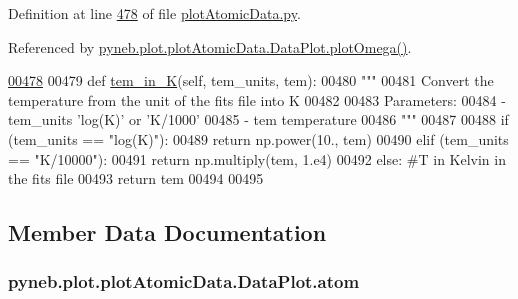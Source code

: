 Definition at line \hyperlink{plot_atomic_data_8py_source_l00478}{478} of file \hyperlink{plot_atomic_data_8py_source}{plot\-Atomic\-Data.\-py}.



Referenced by \hyperlink{plot_atomic_data_8py_source_l00373}{pyneb.\-plot.\-plot\-Atomic\-Data.\-Data\-Plot.\-plot\-Omega()}.


\begin{DoxyCode}
\hypertarget{classpyneb_1_1plot_1_1plot_atomic_data_1_1_data_plot_l00478}{}\hyperlink{classpyneb_1_1plot_1_1plot_atomic_data_1_1_data_plot_a44a19b283355d6c3ad1903e70009cfee}{00478} 
00479     \textcolor{keyword}{def }\hyperlink{classpyneb_1_1plot_1_1plot_atomic_data_1_1_data_plot_a44a19b283355d6c3ad1903e70009cfee}{tem\_in\_K}(self, tem\_units, tem):
00480         \textcolor{stringliteral}{"""}
00481 \textcolor{stringliteral}{        Convert the temperature from the unit of the fits file into K}
00482 \textcolor{stringliteral}{}
00483 \textcolor{stringliteral}{        Parameters:}
00484 \textcolor{stringliteral}{            - tem\_units     'log(K)' or 'K/1000'}
00485 \textcolor{stringliteral}{            - tem           temperature}
00486 \textcolor{stringliteral}{        """}
00487         
00488         \textcolor{keywordflow}{if} (tem\_units == \textcolor{stringliteral}{"log(K)"}):
00489             \textcolor{keywordflow}{return} np.power(10., tem)
00490         \textcolor{keywordflow}{elif} (tem\_units == \textcolor{stringliteral}{"K/10000"}):
00491             \textcolor{keywordflow}{return} np.multiply(tem, 1.e4)
00492         \textcolor{keywordflow}{else}: \textcolor{comment}{#T in Kelvin in the fits file}
00493             \textcolor{keywordflow}{return} tem
00494                 
00495     
\end{DoxyCode}


\subsection{Member Data Documentation}
\hypertarget{classpyneb_1_1plot_1_1plot_atomic_data_1_1_data_plot_af5bbbf002544d1336f7f673a6e777f2e}{
\subsubsection[{atom}]{\setlength{\rightskip}{0pt plus 5cm}pyneb.\-plot.\-plot\-Atomic\-Data.\-Data\-Plot.\-atom}}\label{classpyneb_1_1plot_1_1plot_atomic_data_1_1_data_plot_af5bbbf002544d1336f7f673a6e777f2e}


